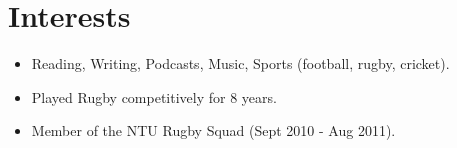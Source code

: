 \section{Interests}\label{interests}

\begin{itemize}
\tightlist
\item
  Reading, Writing, Podcasts, Music, Sports (football, rugby, cricket).
\item
  Played Rugby competitively for 8 years.
\item
  Member of the NTU Rugby Squad (Sept 2010 - Aug 2011).
\end{itemize}
